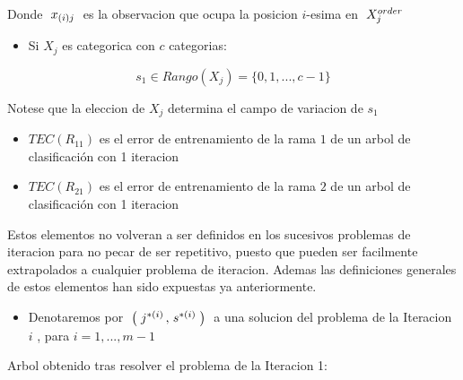 \documentclass[
  11pt,
  a4paper,
]{article}
\providecommand{\tightlist}{%
  \setlength{\itemsep}{0pt}\setlength{\parskip}{0pt}}
\begin{document}
Donde \(\hspace{0.1cm} x_{(i)j} \hspace{0.1cm}\) es la observacion que
ocupa la posicion \(i\)-esima en \(\hspace{0.1cm} X_j^{order}\)

\begin{itemize}
\tightlist
\item
  Si \(X_j\) es categorica con \(c\) categorias:
\end{itemize}

\[ s_1 \in Rango(X_j) = \lbrace 0,1,..., c-1 \rbrace \]

\vspace{0.5cm}

Notese que la eleccion de \(X_j\) determina el campo de variacion de
\(s_1\)

\begin{itemize}
\item
  \(TEC(R_{11})\) es el error de entrenamiento de la rama \(1\) de un
  arbol de clasificación con 1 iteracion
\item
  \(TEC(R_{21})\) es el error de entrenamiento de la rama \(2\) de un
  arbol de clasificación con 1 iteracion
\end{itemize}

Estos elementos no volveran a ser definidos en los sucesivos problemas
de iteracion para no pecar de ser repetitivo, puesto que pueden ser
facilmente extrapolados a cualquier problema de iteracion. Ademas las
definiciones generales de estos elementos han sido expuestas ya
anteriormente.

\begin{itemize}
\tightlist
\item
  Denotaremos por
  \(\hspace{0.1cm} \left(\hspace{0.1cm} j^{*(i)} \hspace{0.05cm},\hspace{0.05cm} s^{*(i)} \hspace{0.1cm}\right) \hspace{0.1cm}\)
  a una solucion del problema de la Iteracion \(i\) , para
  \(i=1,...,m-1\)
\end{itemize}

\vspace{1.5cm}

Arbol obtenido tras resolver el problema de la Iteracion 1:
\end{document}
